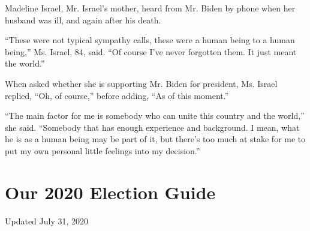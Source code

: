 Madeline Israel, Mr. Israel's mother, heard from Mr. Biden by phone when
her husband was ill, and again after his death.

``These were not typical sympathy calls, these were a human being to a
human being,'' Ms. Israel, 84, said. ``Of course I've never forgotten
them. It just meant the world.''

When asked whether she is supporting Mr. Biden for president, Ms. Israel
replied, ``Oh, of course,'' before adding, ``As of this moment.''

``The main factor for me is somebody who can unite this country and the
world,'' she said. ``Somebody that has enough experience and background.
I mean, what he is as a human being may be part of it, but there's too
much at stake for me to put my own personal little feelings into my
decision.''

\hypertarget{our-2020-election-guide}{%
\section{Our 2020 Election Guide}\label{our-2020-election-guide}}

Updated July 31, 2020

